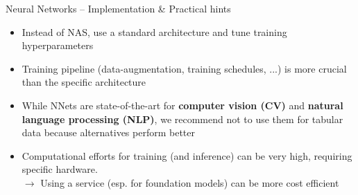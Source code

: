 \begin{frame}{Neural Networks -- Implementation \& Practical hints}

\begin{itemize}
    \item Instead of NAS, use a standard architecture and tune training hyperparameters
    \item Training pipeline (data-augmentation, training schedules, ...) is more crucial than the specific architecture
    \item While NNets are state-of-the-art for \textbf{computer vision (CV)} and \textbf{natural language processing (NLP)}, we recommend not to use them for tabular data because alternatives perform better
    \item Computational efforts for training (and inference) can be very high, requiring specific hardware.\\
    $\rightarrow$ Using a service (esp. for foundation models) can be more cost efficient
\end{itemize}




\end{frame}
